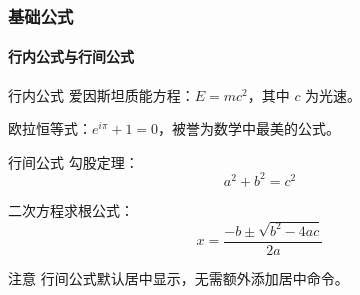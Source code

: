 \begin{frame}
\frametitle{基础公式}
\framesubtitle{行内公式与行间公式}

\begin{block}{行内公式}
爱因斯坦质能方程：$E = mc^2$，其中 $c$ 为光速。

欧拉恒等式：$e^{i\pi} + 1 = 0$，被誉为数学中最美的公式。
\end{block}

\begin{exampleblock}{行间公式}
勾股定理：
\[
a^2 + b^2 = c^2
\]

二次方程求根公式：
\[
x = \frac{-b \pm \sqrt{b^2 - 4ac}}{2a}
\]
\end{exampleblock}

\begin{alertblock}{注意}
行间公式默认居中显示，无需额外添加居中命令。
\end{alertblock}
\end{frame}
